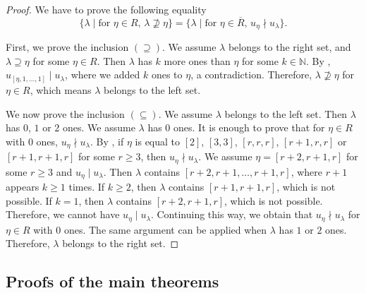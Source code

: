 \documentclass[a4paper, 12pt, reqno]{amsart}
\theoremstyle{remark}
\begin{document}
\begin{proof}
  We have to prove the following equality
  \begin{equation*}
    \{\lambda \mid \text{for $\eta \in R$, $\lambda \nsupseteq \eta$}\} = \{\lambda \mid \text{for $\eta \in \overline{R}$, $u_{\eta} \nmid u_{\lambda}$}\}.
  \end{equation*}

  First, we prove the inclusion $(\supseteq)$.
  We assume $\lambda$ belongs to the right set, and $\lambda \supseteq \eta$ for some $\eta \in R$.
  Then $\lambda$ has $k$ more ones than $\eta$ for some $k \in \mathbb{N}$.
  By , $u_{[\eta, 1, \dots, 1]} \mid u_{\lambda}$, where we added $k$ ones to $\eta$, a contradiction.
  Therefore, $\lambda \nsupseteq \eta$ for $\eta \in R$, which means $\lambda$ belongs to the left set.

  We now prove the inclusion $(\subseteq)$.
  We assume $\lambda$ belongs to the left set.
  Then $\lambda$ has $0$, $1$ or $2$ ones.
  We assume $\lambda$ has $0$ ones.
  It is enough to prove that for $\eta \in R$ with $0$ ones, $u_{\eta} \nmid u_{\lambda}$.
  By , if $\eta$ is equal to $[2]$, $[3, 3]$, $[r, r, r]$, $[r + 1, r, r]$ or $[r + 1, r + 1, r]$ for some $r \ge 3$, then $u_{\eta} \nmid u_{\lambda}$.
  We assume $\eta = [r + 2, r + 1, r]$ for some $r \ge 3$ and $u_{\eta} \mid u_{\lambda}$.
  Then $\lambda$ contains $[r + 2, r + 1, \dots, r + 1, r]$, where $r + 1$ appears $k \ge 1$ times.
  If $k \ge 2$, then $\lambda$ contains $[r + 1, r + 1, r]$, which is not possible.
  If $k = 1$, then $\lambda$ contains $[r + 2, r + 1, r]$, which is not possible.
  Therefore, we cannot have $u_{\eta} \mid u_{\lambda}$.
  Continuing this way, we obtain that $u_{\eta} \nmid u_{\lambda}$ for $\eta \in R$ with $0$ ones.
  The same argument can be applied when $\lambda$ has $1$ or $2$ ones.
  Therefore, $\lambda$ belongs to the right set.
\end{proof}

\subsection{Proofs of the main theorems}
\label{sec:proofs-main-theorems}
\end{document}
